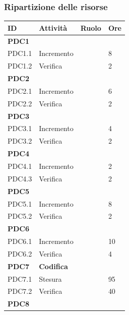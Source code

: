 \documentclass[12pt,a4paper]{article}
\begin{document}
\subsubsection{Ripartizione delle risorse}

\begin{table}[H]
	\begin{center}
		\begin{tabular}{p{} p{} p{} p{}}
			\toprule
			\textbf{ID}	& \textbf{Attività}	& \textbf{Ruolo} & \textbf{Ore} \\ \midrule
			\midrule
			\textbf{PDC1} & \textbf{\AdR} & &  \\ \midrule
			PDC1.1 & Incremento & \AN & 8 \\ \midrule
			PDC1.2 & Verifica & \VR & 2 \\ \midrule
			\textbf{PDC2} & \textbf{\NdP} &  & \\ \midrule
			PDC2.1 & Incremento & \AM & 6 \\ \midrule
			PDC2.2 & Verifica & \VR & 2 \\ \midrule
			\textbf{PDC3} & \textbf{\PdP} & &  \\ \midrule
			PDC3.1 & Incremento & \RE & 4 \\ \midrule
			PDC3.2 & Verifica & \VR & 2 \\ \midrule
			\textbf{PDC4} & \textbf{\PdQ} & & \\ \midrule
			PDC4.1 & Incremento & \RE \newline \PG & 2 \newline 6 \\ \midrule
			PDC4.3 & Verifica & \VR & 2 \\ \midrule
			\textbf{PDC5} & \textbf{\ST} & & \\ \midrule
			PDC5.1 & Incremento & \PG & 8 \\ \midrule
			PDC5.2 & Verifica & \VR & 2 \\ \midrule
			\textbf{PDC6} & \textbf{\DP} & & \\ \midrule
			PDC6.1 & Incremento & \PG & 10 \\ \midrule
			PDC6.2 & Verifica & \VR & 4 \\ \midrule
			\textbf{PDC7} & \textbf{Codifica} & & \\ \midrule
			PDC7.1 & Stesura & \PR & 95 \\ \midrule
			PDC7.2 & Verifica & \VR & 40 \\ \midrule
			\textbf{PDC8} & \textbf{\MU} & & \\ \midrule

\end{tabular}
\end{center}
\end{table}
\end{document}
